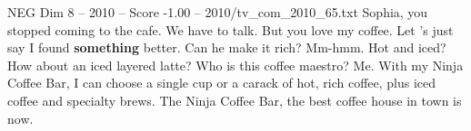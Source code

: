 \begin{textsample}{NEG Dim 8 – 2010 – Score -1.00 – 2010/tv\_com\_2010\_65.txt}  \label{ex:f8_neg_044}
Sophia, you stopped coming to the cafe.
We have to talk.
But you love my coffee.
Let 's just say I found \textbf{something} better.
Can he make it rich?
Mm-hmm.
Hot and iced?
How about an iced layered latte?
Who is this coffee maestro?
Me.
With my Ninja Coffee Bar, I can choose a single cup or a carack of hot, rich coffee, plus iced coffee and specialty brews.
The Ninja Coffee Bar, the best coffee house in town is now.

\end{textsample}
